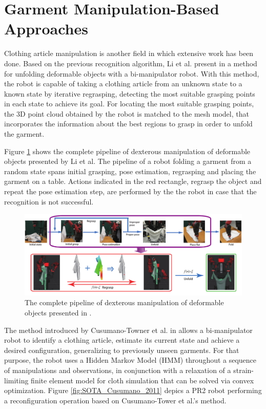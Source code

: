 \section{Garment Manipulation-Based Approaches}
\label{sota:garment_manipulation_based}
Clothing article manipulation is another field in which extensive work has been done. Based on the previous recognition algorithm, Li et al. present in \cite{Li2015ICRA} a method for unfolding deformable objects with a bi-manipulator robot. With this method, the robot is capable of taking a clothing article from an unknown state to a known state by iterative regrasping, detecting the most suitable grasping points in each state to achieve its goal. For locating the most suitable grasping points, the 3D point cloud obtained by the robot is matched to the mesh model, that incorporates the information about the best regions to grasp in order to unfold the garment. 

Figure \ref{fig:SOTA_Li_2015} shows the complete pipeline of dexterous manipulation of deformable objects presented by Li et al. The pipeline of a robot folding a garment from a random state spans initial grasping, pose estimation, regrasping and placing the garment on a table. Actions indicated in the red rectangle, regrasp the object and repeat the pose estimation step, are performed by the the robot in case that the recognition is not successful.

\begin{figure}[thpb]
    \centering
    \includegraphics[width=\textwidth]{figures/SOTA_Li_2015.png}
    \caption[The complete pipeline of dexterous manipulation of deformable objects presented by Li et al.]
    {The complete pipeline of dexterous manipulation of deformable objects presented in \cite{Li2015ICRA}. }
    \label{fig:SOTA_Li_2015}
\end{figure}

The method introduced by Cusumano-Towner et al. in \cite{Cusumano-Towner2011} allows a bi-manipulator robot to identify a clothing article, estimate its current state and achieve a desired configuration, generalizing to previously unseen garments. For that purpose, the robot uses a Hidden Markov Model (HMM) throughout a sequence of manipulations and observations, in conjunction with a relaxation of a strain-limiting finite element model for cloth simulation that can be solved via convex optimization. Figure \ref{fig:SOTA_Cusumano_2011} depics a PR2 robot performing a reconfiguration operation based on Cusumano-Tower et al.'s method.

